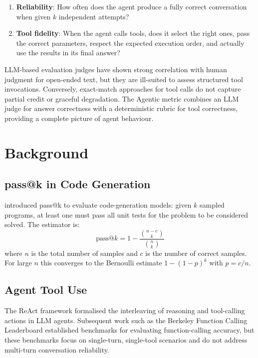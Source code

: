 \documentclass[11pt,a4paper]{article}
\begin{document}
\begin{enumerate}[leftmargin=*]
    \item \textbf{Reliability}: How often does the agent produce a fully
    correct conversation when given $k$ independent attempts?
    \item \textbf{Tool fidelity}: When the agent calls tools, does it select
    the right ones, pass the correct parameters, respect the expected
    execution order, and actually use the results in its final answer?
\end{enumerate}

LLM-based evaluation judges \citep{geval2023} have shown strong correlation
with human judgment for open-ended text, but they are ill-suited to assess
structured tool invocations. Conversely, exact-match approaches for tool calls
\citep{bfcl2024} do not capture partial credit or graceful degradation. The
Agentic metric combines an LLM judge for answer correctness with a
deterministic rubric for tool correctness, providing a complete picture of
agent behaviour.

\section{Background}

\subsection{pass@k in Code Generation}

\citet{humaneval2021} introduced pass@k to evaluate code-generation models:
given $k$ sampled programs, at least one must pass all unit tests for the
problem to be considered solved. The estimator is:
\[
    \text{pass@}k = 1 - \frac{\binom{n-c}{k}}{\binom{n}{k}}
\]
where $n$ is the total number of samples and $c$ is the number of correct
samples. For large $n$ this converges to the Bernoulli estimate
$1-(1-p)^k$ with $p=c/n$.

\subsection{Agent Tool Use}

The ReAct framework \citep{react2022} formalised the interleaving of reasoning
and tool-calling actions in LLM agents. Subsequent work such as the Berkeley
Function Calling Leaderboard \citep{bfcl2024} established benchmarks for
evaluating function-calling accuracy, but these benchmarks focus on
single-turn, single-tool scenarios and do not address multi-turn conversation
reliability.
\end{document}
